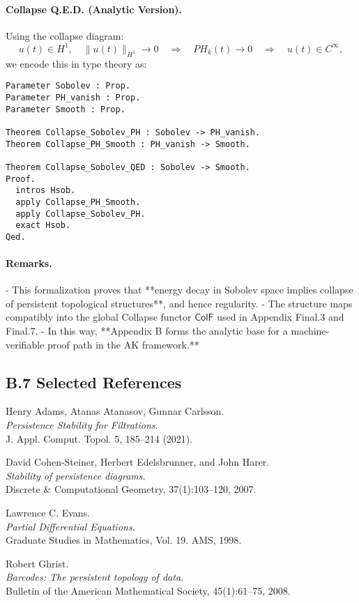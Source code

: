 \documentclass[11pt]{article}
\begin{document}
\paragraph{Collapse Q.E.D. (Analytic Version).}
Using the collapse diagram:
\[
u(t) \in H^1, \quad \|u(t)\|_{H^1} \to 0 \quad \Rightarrow \quad PH_k(t) \to 0 \quad \Rightarrow \quad u(t) \in C^\infty,
\]
we encode this in type theory as:

\begin{lstlisting}[language=Coq, caption=Collapse Q.E.D. in Sobolev-Topological Domain]
Parameter Sobolev : Prop.
Parameter PH_vanish : Prop.
Parameter Smooth : Prop.

Theorem Collapse_Sobolev_PH : Sobolev -> PH_vanish.
Theorem Collapse_PH_Smooth : PH_vanish -> Smooth.

Theorem Collapse_Sobolev_QED : Sobolev -> Smooth.
Proof.
  intros Hsob.
  apply Collapse_PH_Smooth.
  apply Collapse_Sobolev_PH.
  exact Hsob.
Qed.
\end{lstlisting}

\paragraph{Remarks.}
- This formalization proves that **energy decay in Sobolev space implies collapse of persistent topological structures**, and hence regularity.
- The structure maps compatibly into the global Collapse functor \( \mathsf{ColF} \) used in Appendix Final.3 and Final.7.
- In this way, **Appendix B forms the analytic base for a machine-verifiable proof path in the AK framework.**



\subsection*{B.7 Selected References}

\begin{thebibliography}{9}

Henry Adams, Atanas Atanasov, Gunnar Carlsson.\\
\textit{Persistence Stability for Filtrations}.\\
J. Appl. Comput. Topol. 5, 185–214 (2021).

David Cohen-Steiner, Herbert Edelsbrunner, and John Harer.\\
\textit{Stability of persistence diagrams}.\\
Discrete \& Computational Geometry, 37(1):103--120, 2007.

Lawrence C. Evans.\\
\textit{Partial Differential Equations}.\\
Graduate Studies in Mathematics, Vol. 19. AMS, 1998.

Robert Ghrist.\\
\textit{Barcodes: The persistent topology of data}.\\
Bulletin of the American Mathematical Society, 45(1):61--75, 2008.

\end{thebibliography}
\end{document}
